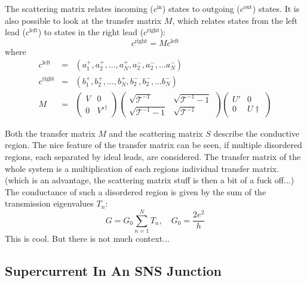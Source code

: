 The scattering matrix relates incoming ($c^\text{in}$) states to outgoing ($c^\text{out}$) states. It is also possible to look at the transfer matrix $M$, which relates states from the left lead ($c^\text{left}$) to states in the right lead ($c^\text{right}$):
\begin{equation}
c^\text{right} = M c^\text{left}
\end{equation}
where 
\begin{eqnarray}
c^\text{left} &=& \left( a_1^+, a_2^+, \dots, a_N^+, a_2^-, a_2^-, \dots a_N^-\right) \\
c^\text{right} &=& \left( b_1^+, b_2^+, \dots, b_N^+, b_2^-, b_2^-, \dots b_N^-\right) \\
M &=& \begin{pmatrix} V & 0 \\ 0 & V'^\dagger \end{pmatrix} \begin{pmatrix} \sqrt{\mathcal{T}^{-1}} & \sqrt{\mathcal{T}^{-1} -1} \\ \sqrt{\mathcal{T}^{-1} -1} & \sqrt{\mathcal{T}^{-1}}\end{pmatrix} \begin{pmatrix} U' & 0 \\ 0 & U\dagger \end{pmatrix}
\end{eqnarray}

Both the transfer matrix $M$ and the scattering matrix $S$ describe the conductive region. The nice feature of the transfer matrix can be seen, if multiple disordered regions, each separated by ideal leads, are considered. The transfer matrix of the whole system is a multiplication of each regions individual transfer matrix. (which is an advantage, the scattering matrix stuff is then a bit of a fuck off...)
The conductance of such a disordered region is given by the sum of the transmission eigenvalues $T_n$:
\begin{equation}
G = G_0 \sum_{n=1}^N T_n, \quad G_0 = \frac{2e^2}{h}
\end{equation}
This is cool. But there is not much context...

\subsection{Supercurrent In An SNS Junction}\label{sec:scattering-supercurrent}

